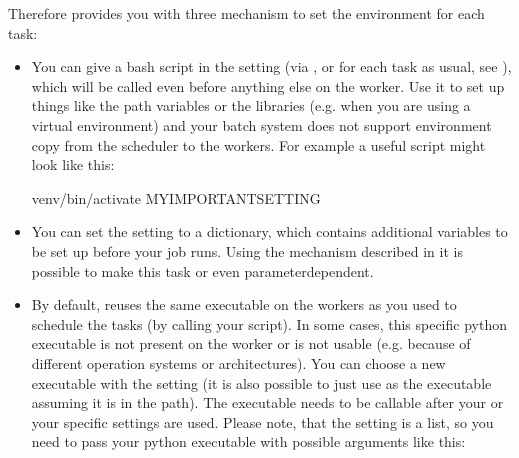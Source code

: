\documentclass[letterpaper,10pt,english]{sphinxmanual}
\begin{document}
Therefore  provides you with three mechanism to set the environment for each task:
\begin{itemize}
\item {} 
You can give a bash script in the  setting (via ,  or for each task as usual,
see {\hyperref[\detokenize{documentation/api:b2luigi.get_setting}]{}}), which will be called even before anything else on the worker.
Use it to set up things like the path variables or the libraries (e.g. when you are using a virtual environment) and your
batch system does not support environment copy from the scheduler to the workers.
For example a useful script might look like this:

\begin{sphinxVerbatim}[commandchars=\\\{\}]
 venv/bin/activate
 MY\PYGZus{}IMPORTANT\PYGZus{}SETTING 
\end{sphinxVerbatim}

\item {} 
You can set the  setting to a dictionary, which contains additional variables to be set up before your job runs.
Using the mechanism described in {\hyperref[\detokenize{documentation/api:b2luigi.get_setting}]{}} it is possible to make this task\sphinxhyphen{} or even parameter\sphinxhyphen{}dependent.

\item {} 
By default,  re\sphinxhyphen{}uses the same  executable on the workers as you used to schedule the tasks (by calling your script).
In some cases, this specific python executable is not present on the worker or is not usable (e.g. because of different operation systems
or architectures).
You can choose a new executable with the  setting (it is also possible to just use  as the executable assuming
it is in the path).
The executable needs to be callable after your  or your specific  settings are used.
Please note, that the  setting is a list, so you need to pass your python executable with possible arguments like this:

\begin{sphinxVerbatim}[commandchars=\\\{\}]
 \PYG{p}{[}\PYG{p}{]}
\end{sphinxVerbatim}

\end{itemize}
\end{document}
